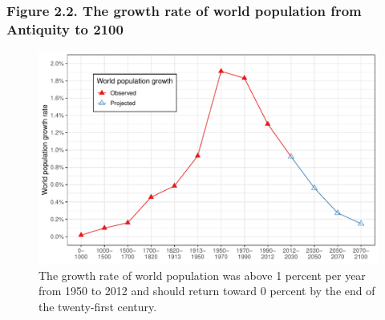\documentclass[t]{beamer}\usepackage[]{graphicx}\usepackage[]{color}
\newenvironment{knitrout}{}{} %
\begin{document}
\begin{frame}[label=Figure_2_2]
\frametitle{Figure 2.2. The growth rate of world population from Antiquity to 2100}
\begin{figure}[t]
\begin{minipage}[b]{\textwidth}
\centering
\begin{knitrout}\footnotesize
{}\color{fgcolor}

{\centering \includegraphics[width=1\linewidth]{figures/color/Figure_2_2} 

}



\end{knitrout}
\caption{The growth rate of world population was above 1 percent per year from 1950 to 2012 and should return toward 0 percent by the end of the twenty-first century.}
\end{minipage}
\end{figure}
\end{frame}
\end{document}
